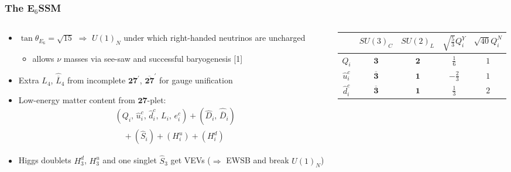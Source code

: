 \documentclass[10pt,aspectratio=169]{beamer}
\begin{document}
\begin{frame}
  \frametitle{The E$_6$SSM}
    \begin{columns}[t]
      \begin{column}{0.5\textwidth}
        \begin{itemize} \itemsep0.2em
        \item $\tan\theta_{E_6} = \sqrt{15}$ $\Rightarrow$ $U(1)_N$
          under which right-handed neutrinos are uncharged
          \begin{itemize}
            \item allows {\color{blue} $\nu$ masses via see-saw} and
              {\color{blue} successful baryogenesis} [1]
          \end{itemize}
        \item Extra $L_4$, $\hat{\overline{L}}_4$ from incomplete
          $\mathbf{27}^\prime$, $\mathbf{\overline{27}}^\prime$ for gauge
          unification
        \item Low-energy matter content from $\mathbf{27}$-plet:
          \begin{align*}
            &(Q_i, \, \hat{u}^c_i, \, \hat{d}^c_i, \, L_i, \,
            e^c_i) + (\hat{D}_i, \, \hat{\overline{D}}_i)\\
            &\quad {} + (\hat{S}_{i}) + (H^u_i) + (H^d_i)
          \end{align*}
        \item Higgs doublets $H^d_3$, $H^u_3$ and one singlet
          $\hat{S}_3$ get VEVs ($\Rightarrow$ EWSB and break $U(1)_N$)
          \vfill
        \end{itemize}
      \end{column}
      \begin{column}{0.5\textwidth}
        \vspace{-40pt}
        \begin{table}[h]
          \centering
          \begin{tabular}{ccccc}
            \toprule
            & $SU(3)_C$ & $SU(2)_L$ & $\sqrt{\frac{5}{3}} Q_i^Y$
            & $\sqrt{40} Q_i^N$ \\
            \midrule
            $Q_i$ & $\mathbf{3}$ & $\mathbf{2}$ & $\frac{1}{6}$ & $1$ \\
            $\hat{u}_i^c$ & $\mathbf{\overline{3}}$ & $\mathbf{1}$
            & $-\frac{2}{3}$ & $1$ \\
            $\hat{d}_i^c$ & $\mathbf{\overline{3}}$ & $\mathbf{1}$
            & $\frac{1}{3}$ & $2$ \\

\end{tabular}
\end{table}
\end{column}
\end{columns}
\end{frame}
\end{document}
